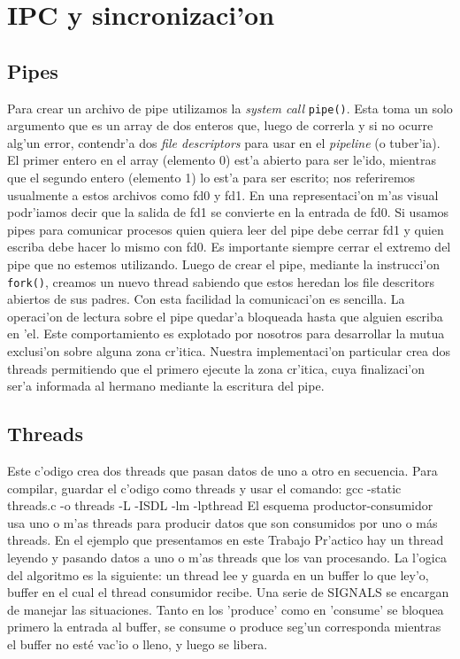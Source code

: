 \section{IPC y sincronizaci'on}
\subsection{Pipes}
Para crear un archivo de pipe utilizamos la \textit{system call} \texttt{pipe()}. Esta toma un solo argumento que es un array de dos enteros que, luego de correrla y si no ocurre alg'un error, contendr'a dos \textit{file descriptors} para usar en el \textit{pipeline} (o tuber'ia). El primer entero en el array (elemento 0) est'a abierto para ser le'ido, mientras que el segundo entero (elemento 1) lo est'a para ser escrito; nos referiremos usualmente a estos archivos como fd0 y fd1. En una representaci'on m'as visual podr'iamos decir que la salida de fd1 se convierte en la entrada de fd0.
Si usamos pipes para comunicar procesos quien quiera leer del pipe debe cerrar fd1 y quien escriba debe hacer lo mismo con fd0. Es importante siempre cerrar el extremo del pipe que no estemos utilizando.
Luego de crear el pipe, mediante la instrucci'on \texttt{fork()}, creamos un nuevo thread sabiendo que estos heredan los file descritors abiertos de sus padres. Con esta facilidad la comunicaci'on es sencilla.
La operaci'on de lectura sobre el pipe quedar'a bloqueada hasta que alguien escriba en 'el. Este comportamiento es explotado por nosotros para desarrollar la mutua exclusi'on sobre alguna zona cr'itica.
Nuestra implementaci'on particular crea dos threads permitiendo que el primero ejecute la zona cr'itica, cuya finalizaci'on ser'a informada al hermano mediante la escritura del pipe. 


\subsection{Threads}
Este c'odigo crea dos threads que pasan datos de uno a otro en secuencia. Para compilar, guardar el c'odigo como threads y usar el comando:
gcc -static threads.c -o threads -L -ISDL -lm -lpthread
El esquema productor-consumidor usa uno o m'as threads para producir datos que son consumidos por uno o más threads. En el ejemplo que presentamos en este Trabajo Pr'actico  hay un thread leyendo y pasando datos a uno o m'as threads que los van procesando.
La l'ogica del algoritmo es la siguiente: un thread lee y guarda en un buffer lo que ley'o, buffer en el  cual el thread consumidor recibe. Una serie de SIGNALS se encargan de manejar las situaciones. Tanto en los 'produce' como en 'consume' se bloquea primero la entrada al buffer, se consume o produce seg'un corresponda mientras el buffer no esté vac'io o lleno, y luego se libera.



